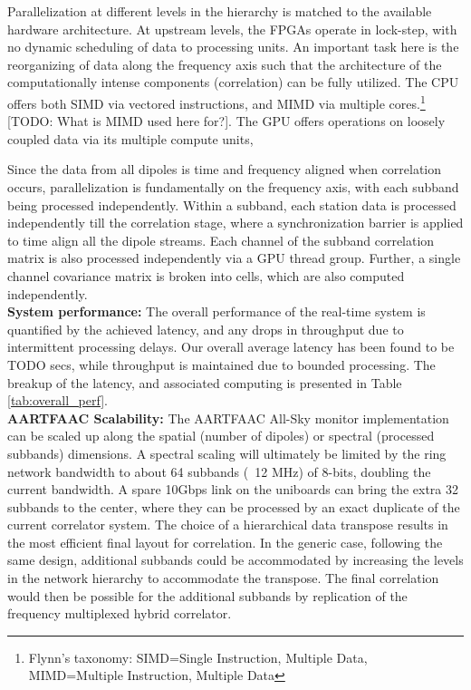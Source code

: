 \documentclass{ws-jai}
\begin{document}
Parallelization at different levels in the hierarchy is matched to the available
hardware architecture.  At upstream levels, the FPGAs operate in lock-step, with
no dynamic scheduling of data to processing units. An important task here is the
reorganizing of data along the frequency  axis such that the architecture of the
computationally intense components (correlation) can  be fully utilized. The CPU
offers   both  SIMD   via   vectored  instructions,   and   MIMD  via   multiple
cores.\footnote  {Flynn's  taxonomy:  SIMD=Single  Instruction,  Multiple  Data,
  MIMD=Multiple Instruction, Multiple Data} [TODO: What is MIMD used here for?]. The GPU offers operations on loosely coupled data via its multiple compute units, 

Since the data  from all dipoles is time and  frequency aligned when correlation
occurs,  parallelization  is fundamentally  on  the  frequency axis,  with  each
subband being processed  independently.  Within a subband, each  station data is
processed  independently till  the  correlation stage,  where a  synchronization
barrier is applied  to time align all  the dipole streams.  Each  channel of the
subband  correlation matrix  is also  processed independently  via a  GPU thread
group.  Further, a single channel covariance  matrix is broken into cells, which
are also computed independently.\\


\noindent \textbf {System performance:} The overall performance of the real-time
system is quantified by the achieved latency, and any drops in throughput due to
intermittent processing delays. Our overall average latency has been found to be
TODO secs, while throughput is maintained due to bounded processing. The breakup
of   the   latency,   and   associated   computing   is   presented   in   Table
\ref{tab:overall_perf}.\\

\noindent  \textbf   {AARTFAAC  Scalability:}   The  AARTFAAC   All-Sky  monitor
implementation  can be  scaled  up  along the  spatial  (number  of dipoles)  or
spectral (processed subbands) dimensions. A  spectral scaling will ultimately be
limited by the ring network bandwidth to  about 64 subbands (~12 MHz) of 8-bits,
doubling the current  bandwidth. A spare 10Gbps link on  the uniboards can bring
the extra  32 subbands to the  center, where they  can be processed by  an exact
duplicate of  the current correlator system.  The choice of a  hierarchical data
transpose results  in the most efficient  final layout for correlation.   In the
generic  case,  following   the  same  design,  additional   subbands  could  be
accommodated by increasing the levels in  the network hierarchy to accommodate the
transpose.   The final  correlation would  then be  possible for  the additional
subbands by replication of the frequency multiplexed hybrid correlator.
\end{document}
